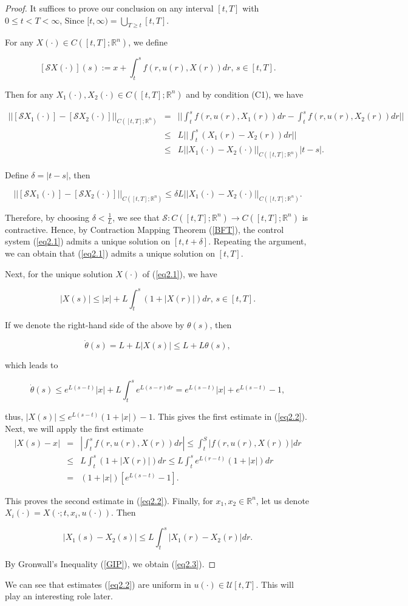 \begin{proof}
It suffices to prove our conclusion on any interval $[t,T]$ with $0\leq t<T<\infty$, Since $[t,\infty)=\bigcup_{T\geq t}[t,T]$.

For any $X(\cdot)\in C([t,T];\mathbb{R}^n)$, we define

$$[\mathcal{S}X(\cdot)](s):=x+\int_{t}^{s}f(r,u(r),X(r))dr,\,s\in [t,T].$$

Then for any $X_1(\cdot),X_2(\cdot)\in C([t,T];\mathbb{R}^n)$ and by condition (C1), we have

\begin{eqnarray*}
||[\mathcal{S}X_1(\cdot)]-[\mathcal{S}X_2(\cdot)]||_{C([t,T];\mathbb{R}^n)}&=&|| \int_{t}^{s}f(r,u(r),X_1(r))dr-\int_{t}^{s}f(r,u(r),X_2(r))dr||\\
&\leq& L||\int_{t}^{s} (X_1(r)-X_2(r)) dr||\\
&\leq& L||X_1(\cdot)-X_2(\cdot)||_{C([t,T];\mathbb{R}^n)}|t-s|.
\end{eqnarray*}

Define $\delta=|t-s|$, then

$$||[\mathcal{S}X_1(\cdot)]-[\mathcal{S}X_2(\cdot)]||_{C([t,T];\mathbb{R}^n)}\leq \delta L||X_1(\cdot)-X_2(\cdot)||_{C([t,T];\mathbb{R}^n)}.$$

Therefore, by choosing $\delta<\frac{1}{L}$, we see that $\mathcal{S}: C([t,T];\mathbb{R}^n)\rightarrow C([t,T];\mathbb{R}^n)$ is contractive. Hence, by Contraction Mapping Theorem (\ref{BFT}), the control system (\ref{eq2.1}) admits a unique solution on $[t,t+\delta]$. Repeating the argument, we can obtain that (\ref{eq2.1}) admits a unique solution on $[t,T]$.

Next, for the unique solution $X(\cdot)$ of (\ref{eq2.1}), we have

$$|X(s)|\leq |x|+L\int_{t}^{s}(1+|X(r)|)dr,\, s\in [t,T].$$

If we denote the right-hand side of the above by $\theta(s)$, then

$$\dot{\theta}(s)=L+L|X(s)|\leq L+L\theta(s),$$

which leads to 

$$\dot{\theta}(s)\leq e^{L(s-t)}|x|+L\int_{t}^{s}e^{L(s-r)dr}=e^{L(s-t)}|x|+e^{L(s-t)}-1,$$

thus, $|X(s)|\leq e^{L(s-t)}(1+|x|)-1.$ This gives the first estimate in (\ref{eq2.2}). Next, we will apply the first estimate
\begin{eqnarray*}
|X(s)-x| &=& |\int_{t}^{s}f(r,u(r),X(r))dr|\leq \int_{t}^{S}|f(r,u(r),X(r))|dr\\
&\leq& L\int_{t}^{s}(1+|X(r)|)dr\leq L\int_{t}^{s}e^{L(r-t)}(1+|x|)dr\\
&=& (1+|x|)[e^{L(s-t)}-1].
\end{eqnarray*}

This proves the second estimate in (\ref{eq2.2}). Finally, for $x_1,x_2\in \mathbb{R}^n$, let us denote $X_i(\cdot)=X(\cdot;t,x_i,u(\cdot))$. Then

$$|X_1(s)-X_2(s)|\leq L\int_{t}^{s} |X_1(r)-X_2(r)|dr.$$

By Gronwall's Inequality (\ref{GIP}), we obtain (\ref{eq2.3}).
\end{proof}

We can see that estimates (\ref{eq2.2}) are uniform in $u(\cdot)\in \mathcal{U}[t,T]$. This will play an interesting role later.